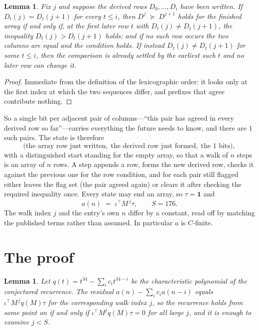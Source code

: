 \documentclass[11pt,a4paper]{article}
\theoremstyle{plain}
\newtheorem{lemma}[theorem]{Lemma}
\theoremstyle{definition}
\begin{document}
\begin{lemma}\label{lem:bits}
Fix $j$ and suppose the derived rows $D_0,\dots,D_i$ have been written. If $D_t(j)=D_t(j+1)$ for
every $t\le i$, then $D^{j}\;\succeq\;D^{j+1}$ holds for the finished array if and only if,
at the first later row $t$ with $D_t(j)\neq D_t(j+1)$, the inequality $D_t(j)>D_t(j+1)$
holds; and if no such row occurs the two columns are equal and the condition holds. If instead
$D_t(j)\neq D_t(j+1)$ for some $t\le i$, then the comparison is already settled by the earliest
such $t$ and no later row can change it.
\end{lemma}

\begin{proof}
Immediate from the definition of the lexicographic order: it looks only at the first index at
which the two sequences differ, and prefixes that agree contribute nothing.
\end{proof}

So a single bit per adjacent pair of columns---``this pair has agreed in every derived row so
far''---carries everything the future needs to know, and there are $1$ such pairs. The state
is therefore
\[
\bigl(\text{the array row just written},\; \text{the derived row just formed},\;
\text{the 1 bits}\bigr),
\]
with a distinguished start standing for the empty array, so that a walk of $n$ steps is an array
of $n$ rows. A step appends a row, forms the new derived row, checks it against the previous one
for the row condition, and for each pair still flagged either leaves the flag set (the pair
agreed again) or clears it after checking the required inequality once. Every state may end an
array, so $\tau=\mathbf{1}$ and
\[
a(n)\;=\;\iota^{\!\top}M^{\,j}\tau ,\qquad S=176.
\]
The walk index $j$ and the entry's own $n$ differ by a constant, read off by matching the
published terms rather than assumed. In particular $a$ is $C$-finite.

\section{The proof}

\begin{lemma}\label{lem:crit}
Let $q(t)=t^{34}-\sum_i c_it^{34-i}$ be the characteristic polynomial of the
conjectured recurrence. The residual $a(n)-\sum_ic_ia(n-i)$ equals
$\iota^{\!\top}M^{\,j}q(M)\tau$ for the corresponding walk index $j$, so the recurrence
holds from some point on if and only if $\iota^{\!\top}M^{j}q(M)\tau=0$ for all large $j$,
and it is enough to examine $j<S$.
\end{lemma}
\end{document}
